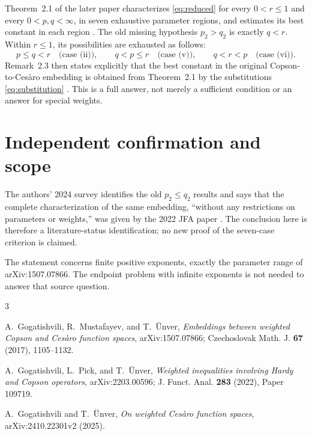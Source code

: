 \documentclass[11pt]{article}
\begin{document}
Theorem~2.1 of the later paper characterizes \eqref{eq:reduced} for every
$0<r\le1$ and every $0<p,q<\infty$, in seven exhaustive parameter regions,
and estimates its best constant in each region \cite[pp.~6--8]{answer}.
The old missing hypothesis $p_2>q_2$ is exactly $q<r$.  Within $r\le1$,
its possibilities are exhausted as follows:
\[
 p\le q<r \quad\text{(case (ii))},\qquad
 q<p\le r \quad\text{(case (v))},\qquad
 q<r<p \quad\text{(case (vi))}.
\]
Remark~2.3 then states explicitly that the best constant in the original
Copson-to-Ces\`aro embedding is obtained from Theorem~2.1 by the substitutions
\eqref{eq:substitution} \cite[p.~8]{answer}.  This is a full answer, not merely
a sufficient condition or an answer for special weights.

\section*{Independent confirmation and scope}

The authors' 2024 survey identifies the old $p_2\le q_2$ results and says
that the complete characterization of the same embedding, ``without any
restrictions on parameters or weights,'' was given by the 2022 JFA paper
\cite[p.~4]{survey}.  The conclusion here is therefore a literature-status
identification; no new proof of the seven-case criterion is claimed.

The statement concerns finite positive exponents, exactly the parameter
range of arXiv:1507.07866.  The endpoint problem with infinite exponents is
not needed to answer that source question.

\sloppy
\begin{thebibliography}{3}
\raggedright
{}
A.~Gogatishvili, R.~Mustafayev, and T.~\"Unver,
\emph{Embeddings between weighted Copson and Ces\`aro function spaces},
arXiv:1507.07866; Czechoslovak Math. J. \textbf{67} (2017), 1105--1132.

A.~Gogatishvili, L.~Pick, and T.~\"Unver,
\emph{Weighted inequalities involving Hardy and Copson operators},
arXiv:2203.00596; J. Funct. Anal. \textbf{283} (2022), Paper 109719.

A.~Gogatishvili and T.~\"Unver,
\emph{On weighted Ces\`aro function spaces}, arXiv:2410.22301v2 (2025).
\end{thebibliography}
\end{document}
